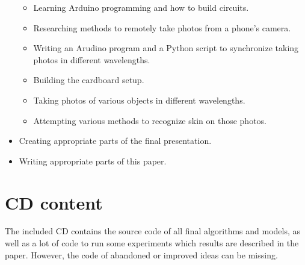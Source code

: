 \begin{itemize}
\begin{itemize}
                \item Learning Arduino programming and how to build circuits.
                \item Researching methods to remotely take photos from a phone's camera.
                \item Writing an Arudino program and a Python script to synchronize
                taking photos in different wavelengths.
                \item Building the cardboard setup.
                \item Taking photos of various objects in different wavelengths.
                \item Attempting various methods to recognize skin on those photos.
            \end{itemize}
            \item Creating appropriate parts of the final presentation.
            \item Writing appropriate parts of this paper.
        \end{itemize}

\chapter{CD content}
    The included CD contains the source code of all final algorithms
    and models, as well as a lot of code to run some experiments
    which results are described in the paper.
    However, the code of abandoned or improved ideas can be missing.

